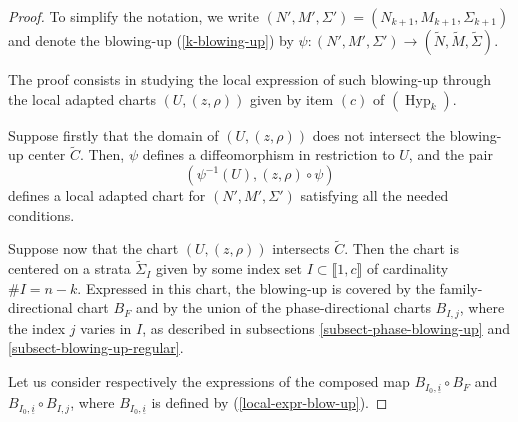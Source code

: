 \documentclass[11pt,psamsfonts]{article}
\newcommand{\tmop}[1]{\ensuremath{\operatorname{#1}}}
\theoremstyle{definition}
\theoremstyle{remark}
\begin{document}
\begin{proof}
  To simplify the notation, we write $(N', M',\Sigma') = (N_{k + 1}, M_{k+1},\Sigma_{k +
  1})$ and denote the blowing-up (\ref{k-blowing-up}) by $\psi : (N', M',\Sigma')
  \rightarrow (\tilde{N}, \tilde{M},\tilde{\Sigma}) .$
  
  The proof consists in studying the local expression of such blowing-up
  through the local adapted charts $(U, (z, \rho))$ given by item $(c)$ of
  $(\tmop{Hyp}_k)$.
  
  Suppose firstly that the domain of $(U, (z, \rho))$ does not intersect the
  blowing-up center $\tilde{C}$. Then, $\psi$ defines a diffeomorphism in
  restriction to $U$, and the pair
  \[ (\psi^{- 1} (U), (z, \rho) \circ \psi) \]
  defines a local adapted chart for $(N', M',\Sigma')$ satisfying all the needed
  conditions.
  
  Suppose now that the chart $(U, (z, \rho))$ intersects $\tilde{C}$.
  Then the chart is centered on a strata $\tilde{\Sigma}_I$ given by some
  index set $I \subset \llbracket 1, c \rrbracket$ of cardinality $\#I = n -
  k$. Expressed in this chart, the blowing-up is covered by the
  family-directional chart $B_F$ and by the union of the phase-directional
  charts $B_{I, j}$, where the index $j$ varies in $I$, as described in subsections \ref{subsect-phase-blowing-up} and \ref{subsect-blowing-up-regular}.
  
  Let us consider respectively the expressions of the composed map $B_{I_0,
  \underline{i}} \circ B_F$ and $B_{I_0, \underline{i}} \circ B_{I, j}$, where
  $B_{I_0, \underline{i}}$ is defined by (\ref{local-expr-blow-up}).
  

\end{proof}
\end{document}

